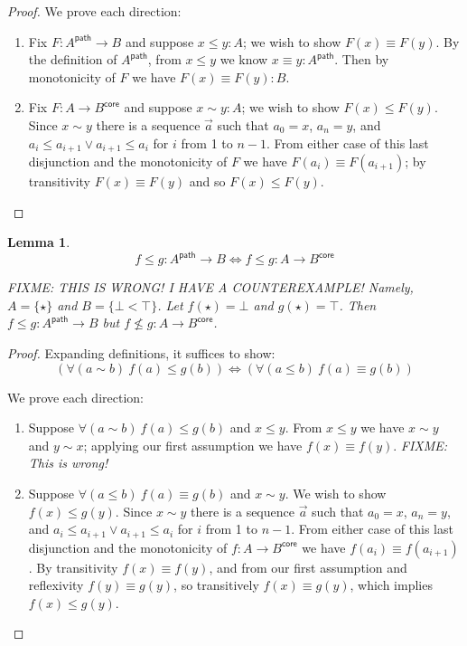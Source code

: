 \documentclass{article}
\newtheorem{lemma}{Lemma}
\newcommand{\ms}[1]{\ensuremath{\mathsf{#1}}}
\newcommand{\iso}{\ms{core}}
\renewcommand{\path}{\ms{path}}
\newcommand{\pathto}{\sim}
\begin{document}
\begin{proof} We prove each direction:
  \begin{enumerate}
  \item Fix $F : A^\path \to B$ and suppose $x \le y : A$; we wish to show $F(x)
    \equiv F(y)$. By the definition of $A^\path$, from $x \le y$ we know $x
    \equiv y : A^\path$. Then by monotonicity of $F$ we have $F(x) \equiv F(y) :
    B$.

  \item Fix $F : A \to B^\iso$ and suppose $x \pathto y : A$; we wish to show
    $F(x) \le F(y)$. Since $x \pathto y$ there is a sequence $\vec{a}$ such that
    $a_0 = x$, $a_n = y$, and $a_i \le a_{i+1} \vee a_{i+1} \le a_i$ for $i$
    from 1 to $n-1$. From either case of this last disjunction and the
    monotonicity of $F$ we have $F(a_i) \equiv F(a_{i+1})$; by transitivity
    $F(x) \equiv F(y)$ and so $F(x) \le F(y)$.
  \end{enumerate}
\end{proof}

\begin{lemma}\label{lem:loccore-2}
  \color{red}
  \[f \le g : A^\path \to B \iff f \le g : A \to B^\iso \]

  \emph{FIXME: THIS IS WRONG! I HAVE A COUNTEREXAMPLE! Namely, $A = \{\star\}$
  and $B = \{\bot < \top\}$. Let $f(\star) = \bot$ and $g(\star) = \top$. Then
  $f \le g : A^\path \to B$ but $f \not\le g : A \to B^\iso$.}
\end{lemma}

\begin{proof}
  Expanding definitions, it suffices to show:
  \[ (\forall(a \pathto b)\ f(a) \le g(b))
  \iff
  (\forall(a \le b)\ f(a) \equiv g(b))
  \]

  We prove each direction:
  \begin{enumerate}
  \item Suppose $\forall(a \pathto b)\ f(a) \le g(b)$ and $x \le y$. From $x \le
    y$ we have $x \pathto y$ and $y \pathto x$; {\color{red} applying our first
      assumption we have $f(x) \equiv f(y)$. \emph{FIXME: This is wrong!}}

  \item Suppose $\forall(a \le b)\ f(a) \equiv g(b)$ and $x \pathto y$. We wish
    to show $f(x) \le g(y)$. Since $x \pathto y$ there is a sequence $\vec{a}$
    such that $a_0 = x$, $a_n = y$, and $a_i \le a_{i+1} \vee a_{i+1} \le a_i$
    for $i$ from 1 to $n-1$. From either case of this last disjunction and the
    monotonicity of $f : A \to B^\iso$ we have $f(a_i) \equiv f(a_{i+1})$. By
    transitivity $f(x) \equiv f(y)$, and from our first assumption and
    reflexivity $f(y) \equiv g(y)$, so transitively $f(x) \equiv g(y)$, which
    implies $f(x) \le g(y)$.
  \end{enumerate}
\end{proof}
\end{document}
